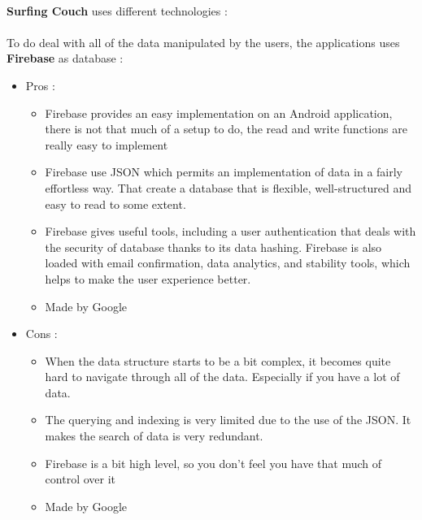 \documentclass[paper=a4, fontsize=12pt,DIV=14]{scrartcl}    %
\begin{document}
				\paragraph{}\textbf{Surfing Couch} uses different technologies :\\
				\paragraph{}To do deal with all of the data manipulated by the users, the applications uses \textbf{Firebase} as database : \\
				\begin{itemize}
					\item Pros :
						\begin{itemize}
						\item 	Firebase provides an easy implementation on an Android application, there is not that much of a setup to do, the read and write functions are really easy to implement
						\item 	Firebase use JSON which permits an implementation of data in a fairly effortless way. That create a database that is flexible, well-structured and easy to read to some extent.
						\item 	Firebase gives useful tools, including a user authentication that deals with the security of database thanks to its data hashing. Firebase is also loaded with email confirmation, data analytics, and stability tools, which helps to make the user experience better.
						\item 	Made by Google
						\end{itemize}

					\item Cons :
						\begin{itemize}
						\item	When the data structure starts to be a bit complex, it becomes quite hard to navigate through all of the data. Especially if you have a lot of data.
						\item	The querying and indexing is very limited due to the use of the JSON. It makes the search of data is very redundant.
						\item	Firebase is a bit high level, so you don’t feel you have that much of control over it
						\item	Made by Google
						\end{itemize}
				\end{itemize}
\end{document}
